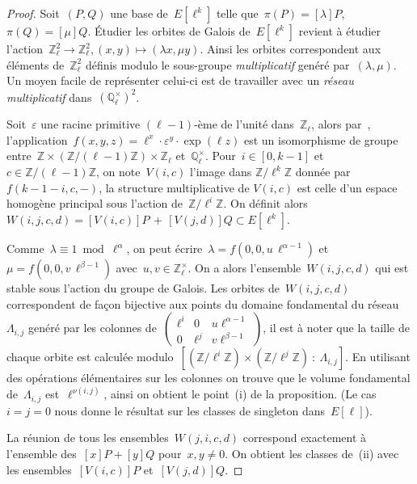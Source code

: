 \documentclass[10pt,a4paper]{book}
\theoremstyle{plain}
\theoremstyle{definition}
\theoremstyle{definition}
\theoremstyle{definition}
\theoremstyle{definition}
\theoremstyle{remark}
\theoremstyle{remark}
\theoremstyle{definition}
\begin{document}
\begin{proof}
Soit~$(P, Q)$ une base de~$E[\ell^k]$ telle que~$\pi(P)=[\lambda] P$, $\pi(Q)=[\mu] Q$.
\'Etudier les orbites de Galois de~$E[\ell^k]$
revient à étudier l'action~$\mathbb{Z}_\ell^2 \rightarrow \mathbb{Z}_\ell^2, (x, y) \mapsto (\lambda x, \mu y)$.
Ainsi les orbites correspondent aux éléments de~$\mathbb{Z}_\ell^2$ définis
modulo le sous-groupe \emph{multiplicatif} genéré par~$(\lambda, \mu)$.
Un moyen facile de représenter celui-ci est de travailler 
avec un \emph{réseau multiplicatif} dans~$(\mathbb{Q}_{\ell}^{\times})^2$.

Soit~$\varepsilon$ une racine primitive $(\ell-1)$-ème de l'unité dans~$\mathbb{Z}_{\ell}$,
alors par~\cite[Théorème II.3.2]{Serre70},
l'application~$f(x, y, z) = \ell^x \cdot \varepsilon^y \cdot \exp (\ell z)$
est un isomorphisme de groupe entre~$\mathbb{Z} \times (\mathbb{Z}/(\ell-1) \mathbb{Z}) \times \mathbb{Z}_{\ell}$ et~$\mathbb{Q}_{\ell}^{\times}$.
Pour~$i \in [0,k-1 ]$ et~$c \in \mathbb{Z}/(\ell-1)\mathbb{Z}$,
on note~$V(i,c)$ l'image dans $\mathbb{Z}/\ell^k \mathbb{Z}$ donnée par~$f(k-1-i,c,- )$, la structure multiplicative de $V(i, c)$
est celle d'un espace homogène principal sous l'action de~$\mathbb{Z}/\ell^i \mathbb{Z}$.
On définit alors~$W(i,j,c,d) = [V(i, c)] P \,+\, [V(j, d)]  Q \subset E[\ell^k]$.

Comme~$\lambda \equiv 1 \bmod \ell^{\alpha}$, on peut écrire~$\lambda = f(0,0,u\, \ell^{\alpha-1})$
et~$\mu = f(0,0, v\, \ell^{\beta-1})$
avec~$u, v \in \mathbb{Z}_{\ell}^{\times}$.
On a alors l'ensemble~$W(i,j,c,d)$ qui est stable sous l'action du groupe de Galois.
Les orbites de~$W(i,j,c,d)$ correspondent de façon bijective
aux points du domaine fondamental du réseau~$\Lambda_{i,j}$ genéré par
les colonnes de~$\left(  \begin{smallmatrix}
\ell^i & 0 & u \ell^{\alpha-1}\\ 
0 & \ell^j & v \ell^{\beta-1}
\end{smallmatrix} \right) $,
il est à noter que la taille de chaque orbite est calculée modulo~$[(\mathbb{Z}/\ell^i \mathbb{Z}) \times (\mathbb{Z}/\ell^j \mathbb{Z})\::\: \Lambda_{i,j}]$.
En utilisant des opérations élémentaires sur les colonnes 
on trouve que  le volume fondamental de~$\Lambda_{i,j}$ est~$\ell^{\nu(i,j)}$,
ainsi on obtient le point~(i) de la proposition.
(Le cas~$i = j = 0$ nous donne le résultat sur les classes de singleton dans~$E[\ell]$).

La réunion de tous les ensembles~$W(j,i,c,d)$
correspond exactement à l'ensemble des~$[x] P + [y] Q$ pour~$x, y \neq 0$.
On obtient les classes de~(ii) avec
les ensembles~$[V(i, c)] P$ et~$[V(j,d)] Q$.
\end{proof}
\end{document}
